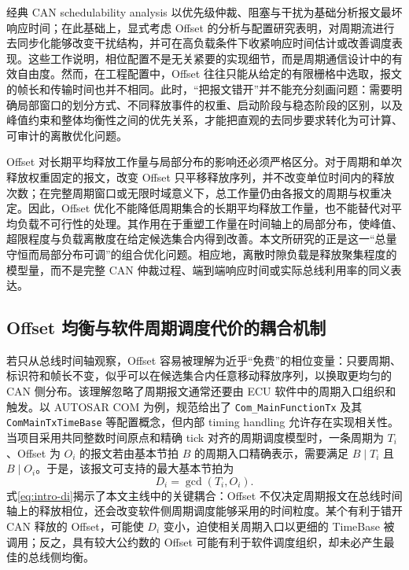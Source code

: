 \documentclass[UTF8,12pt,a4paper]{ctexart}
\begin{document}
经典 CAN schedulability analysis 以优先级仲裁、阻塞与干扰为基础分析报文最坏响应时间\cite{tindell1994}；在此基础上，显式考虑 Offset 的分析与配置研究表明，对周期流进行去同步化能够改变干扰结构，并可在高负载条件下收紧响应时间估计或改善调度表现\cite{grenier2008,yomsi2012}。这些工作说明，相位配置不是无关紧要的实现细节，而是周期通信设计中的有效自由度。然而，在工程配置中，Offset 往往只能从给定的有限栅格中选取，报文的帧长和传输时间也并不相同。此时，“把报文错开”并不能充分刻画问题：需要明确局部窗口的划分方式、不同释放事件的权重、启动阶段与稳态阶段的区别，以及峰值约束和整体均衡性之间的优先关系，才能把直观的去同步要求转化为可计算、可审计的离散优化问题。

Offset 对长期平均释放工作量与局部分布的影响还必须严格区分。对于周期和单次释放权重固定的报文，改变 Offset 只平移释放序列，并不改变单位时间内的释放次数；在完整周期窗口或无限时域意义下，总工作量仍由各报文的周期与权重决定。因此，Offset 优化不能降低周期集合的长期平均释放工作量，也不能替代对平均负载不可行性的处理。其作用在于重塑工作量在时间轴上的局部分布，使峰值、超限程度与负载离散度在给定候选集合内得到改善。本文所研究的正是这一“总量守恒而局部分布可调”的组合优化问题。相应地，离散时隙负载是释放聚集程度的模型量，而不是完整 CAN 仲裁过程、端到端响应时间或实际总线利用率的同义表达。

\subsection{Offset 均衡与软件周期调度代价的耦合机制}

若只从总线时间轴观察，Offset 容易被理解为近乎“免费”的相位变量：只要周期、标识符和帧长不变，似乎可以在候选集合内任意移动释放序列，以换取更均匀的 CAN 侧分布。该理解忽略了周期报文通常还要由 ECU 软件中的周期入口组织和触发。以 AUTOSAR COM 为例，规范给出了 \texttt{Com\_MainFunctionTx} 及其 \texttt{ComMainTxTimeBase} 等配置概念，但内部 timing handling 允许存在实现相关性\cite{autosarcom}。当项目采用共同整数时间原点和精确 tick 对齐的周期调度模型时，一条周期为 $T_i$、Offset 为 $O_i$ 的报文若由基本节拍 $B$ 的周期入口精确表示，需要满足 $B\mid T_i$ 且 $B\mid O_i$。于是，该报文可支持的最大基本节拍为
\begin{equation}
 D_i=\gcd(T_i,O_i).
\label{eq:intro-di}
\end{equation}
式\eqref{eq:intro-di}揭示了本文主线中的关键耦合：Offset 不仅决定周期报文在总线时间轴上的释放相位，还会改变软件侧周期调度能够采用的时间粒度。某个有利于错开 CAN 释放的 Offset，可能使 $D_i$ 变小，迫使相关周期入口以更细的 TimeBase 被调用；反之，具有较大公约数的 Offset 可能有利于软件调度组织，却未必产生最佳的总线侧均衡。
\end{document}
